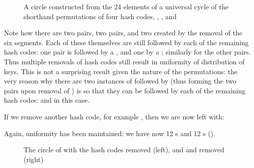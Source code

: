 \documentclass[runningheads,a4paper]{llncs}
\newcommand{\slice}[3]{

  \draw (0,0) -- (#1:1) arc (#1:#2:1);
  \draw (0,0) -- (#1:1.1);

  \node at (#1:1.3) {#3};
}
\begin{document}
\begin{figure}
\begin{center}
\end{center}
\caption{A circle constructed from the 24 elements of a universal
  cycle of the shorthand permutations of four hash codes, ,
  ,  and }
\label{fig:circle-perfect-4}
\end{figure}

Note how there are two  pairs, two  pairs,
and two  created by the removal of the six 
segments. Each of these themselves are still followed by each of the
remaining hash codes: one  pair is followed by a
, and one by a ; similarly for the other pairs. Thus
multiple removals of hash codes still result in uniformity of
distribution of keys. This is not a surprising result given the nature
of the permutations: the very reason why there are two instances of
 followed by  (thus forming the two 
pairs upon removal of ) is so that they can be followed by
each of the remaining hash codes:  and  in this case.

If we remove another hash code, for example , then we are now
left with:



\noindent
Again, uniformity has been maintained: we have now 12 s and 12
s ().

\begin{figure}
\begin{center}

\end{center}
\caption{The circle of  with the hash codes
   removed (left), and  and  removed (right)}
\label{fig:circle-perfect-4-remove}
\end{figure}
\end{document}
